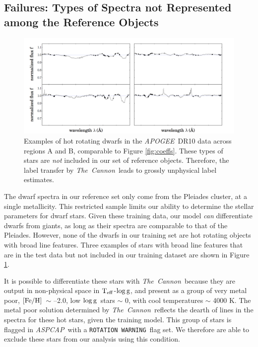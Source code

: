 \documentclass[12pt, preprint]{aastex}
\newcommand{\teff}{\mbox{$\rm T_{eff}$}}
\newcommand{\feh}{\mbox{$\rm [Fe/H]$}}
\newcommand{\logg}{\mbox{$\rm \log g$}}
\newcommand{\tc}{\textsl{The~Cannon}}
\newcommand{\apogee}{\textsl{APOGEE}}
\newcommand{\aspcap}{\textsl{ASPCAP}}
\newcommand{\rotwarn}{\texttt{ROTATION WARNING}}
\begin{document}
\subsection{Failures: Types of Spectra not Represented among the Reference Objects}
\label{sec:AnomalousSpectra}

  \begin{figure}[!h]
   \centering
 \includegraphics[width=\hsize]{./plots/2dwarfs.png}
  \caption{Examples of hot rotating dwarfs in the \apogee\ DR10 data across regions A and B, comparable to Figure \ref{fig:coeffs}. These types of stars are \textit{not} included in our set of reference objects. Therefore, the label transfer by \tc\ leads to grossly unphysical label estimates.}
\label{fig:dwarfs}
\end{figure}


The dwarf spectra in our reference set only come from the Pleiades cluster, at a single metallicity. 
This restricted sample limits our ability to determine the stellar parameters for dwarf stars. 
Given these training data, our model \textit{can} differentiate dwarfs from giants, as long as their spectra are comparable to that of the Pleiades. 
However, none of the dwarfs in our training set are hot rotating objects with broad line features. 
Three examples of stars with broad line features that are in the test data but not included in our training dataset are shown in Figure \ref{fig:dwarfs}.

It is possible to differentiate these stars with \tc\ because they are output in non-physical space in \teff-\logg, and present as a group of very metal poor, \feh\ $\sim$ --2.0, low \logg\ stars $\sim$ 0, with cool temperatures $\sim$ 4000 K. The metal poor solution determined by \tc\ reflects the dearth of lines in the spectra for these hot stars, given the training model. This group of stars is flagged in \aspcap\ with a \rotwarn\ flag set. We therefore are able to exclude these stars from our analysis using this condition. 
 
\end{document}
